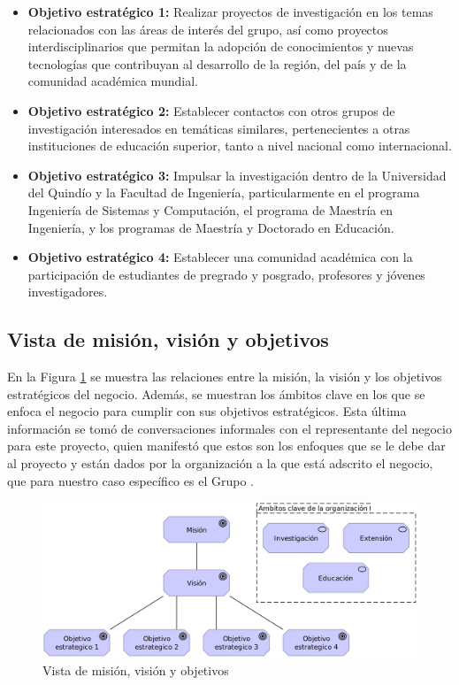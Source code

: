 \begin{itemize}
    \item \textbf{Objetivo estratégico 1:} Realizar proyectos de investigación en los temas relacionados con las áreas de interés del grupo, así como proyectos interdisciplinarios que permitan la adopción de conocimientos y nuevas tecnologías que contribuyan al desarrollo de la región, del país y de la comunidad académica mundial.
    \item \textbf{Objetivo estratégico 2:} Establecer contactos con otros grupos de investigación interesados en temáticas similares, pertenecientes a otras instituciones de educación superior, tanto a nivel nacional como internacional.
    \item \textbf{Objetivo estratégico 3:} Impulsar la investigación dentro de la Universidad del Quindío y la Facultad de Ingeniería, particularmente en el programa Ingeniería de Sistemas y Computación, el programa de Maestría en Ingeniería, y los programas de Maestría y Doctorado en Educación.
    \item \textbf{Objetivo estratégico 4:} Establecer una comunidad académica con la participación de estudiantes de pregrado y posgrado, profesores y jóvenes investigadores.
\end{itemize}

\subsection{Vista de misión, visión y objetivos}
\noindent
En la Figura \ref{fig:archiMVOView} se muestra las relaciones entre la misión, la visión y los objetivos estratégicos del negocio. Además, se muestran los ámbitos clave en los que se enfoca el negocio para cumplir con sus objetivos estratégicos. Esta última información se tomó de conversaciones informales con el representante del negocio para este proyecto, quien manifestó que estos son los enfoques que se le debe dar al proyecto y están dados por la organización a la que está adscrito el negocio, que para nuestro caso específico es el Grupo \GRID.

\begin{figure}[H]
	\centering
	\includegraphics[scale=0.15]{tablas-images/archi/Mission-Values-Vision View.jpg}
	\caption{Vista de misión, visión y objetivos}
    \label{fig:archiMVOView}
\end{figure}

